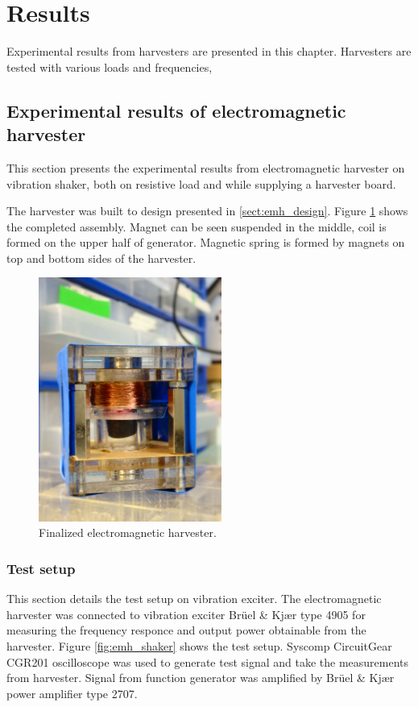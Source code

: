 \section{Results}
Experimental results from harvesters are presented in this chapter. Harvesters are tested with various loads and frequencies, 

\subsection{Experimental results of electromagnetic harvester}
This section presents the experimental results from electromagnetic harvester on vibration shaker, both on resistive load and while supplying a harvester board. 

The harvester was built to design presented in \ref{sect:emh_design}. Figure \ref{fig:emh_final} shows the completed assembly. Magnet can be seen suspended in the middle, coil is formed on the upper half of generator. Magnetic spring is formed by magnets on top and bottom sides of the harvester. 

\begin{figure}[htb]
\begin{center}
\includegraphics[height=8cm]{images/own_pic/inductive_harvester.jpg}
\end{center}
\caption{\label{fig:emh_final} Finalized electromagnetic harvester.}
\end{figure}


\subsubsection{Test setup}
This section details the test setup on vibration exciter. The electromagnetic harvester was connected to vibration exciter Brüel & Kjær type 4905 for measuring the frequency responce and output power obtainable from the harvester. Figure \ref{fig:emh_shaker} shows the test setup. Syscomp CircuitGear CGR201 oscilloscope was used to generate test signal and take the measurements from harvester. Signal from function generator was amplified by Brüel & Kjær power amplifier type 2707.

